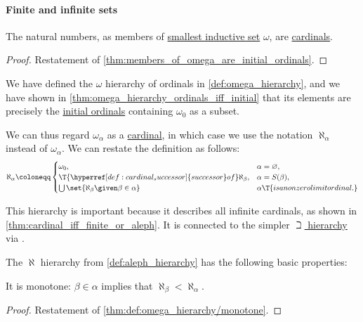 \paragraph{Finite and infinite sets}

\begin{proposition}\label{thm:members_of_omega_are_cardinals}
  The natural numbers, as members of \hyperref[def:smallest_inductive_set]{smallest inductive set} \( \omega \), are \hyperref[def:cardinal]{cardinals}.
\end{proposition}
\begin{proof}
  Restatement of \cref{thm:members_of_omega_are_initial_ordinals}.
\end{proof}

\begin{definition}\label{def:aleph_hierarchy}
  We have defined the \( \omega \) hierarchy of ordinals in \cref{def:omega_hierarchy}, and we have shown in \cref{thm:omega_hierarchy_ordinals_iff_initial} that its elements are precisely the \hyperref[def:initial_ordinal]{initial ordinals} containing \( \omega_0 \) as a subset.

  We can thus regard \( \omega_\alpha \) as a \hyperref[def:cardinal]{cardinal}, in which case we use the notation \( \aleph_\alpha \) instead of \( \omega_\alpha \). We can restate the definition as follows:
  \begin{equation*}
    \aleph_\alpha \coloneqq \begin{cases}
      \omega_0,                                                         &\alpha = \varnothing, \\
      \T{\hyperref[def:cardinal_successor]{successor} of} \aleph_\beta, &\alpha = S(\beta), \\
      \bigcup\set{ \aleph_\beta \given \beta \in \alpha }               &\alpha \T{is a nonzero limit ordinal.}
    \end{cases}
  \end{equation*}
\end{definition}
\begin{comments}
  \item This hierarchy is important because it describes all infinite cardinals, as shown in \cref{thm:cardinal_iff_finite_or_aleph}. It is connected to the simpler \hyperref[def:beth_hierarchy]{\( \beth \) hierarchy} via .
\end{comments}

\begin{proposition}\label{thm:def:aleph_hierarchy}
  The \( \aleph \) hierarchy from \cref{def:aleph_hierarchy} has the following basic properties:
  \begin{thmenum}
     It is monotone: \( \beta \in \alpha \) implies that \( \aleph_\beta < \aleph_\alpha \).
  \end{thmenum}
\end{proposition}
\begin{proof}
   Restatement of \cref{thm:def:omega_hierarchy/monotone}.
\end{proof}

